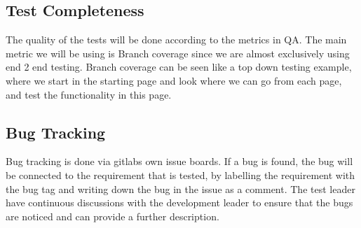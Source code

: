 \subsection{Test Completeness}
The quality of the tests will be done according to the metrics in QA. The main metric we will be using is Branch coverage since we are almost exclusively using end 2 end testing. Branch coverage can be seen like a top down testing example, where we start in the starting page and look where we can go from each page, and test the functionality in this page. 

\subsection{Bug Tracking}
Bug tracking is done via gitlabs own issue boards. If a bug is found, the bug will be connected to the requirement that is tested, by labelling the requirement with the bug tag and writing down the bug in the issue as a comment. The test leader have continuous discussions with the development leader to ensure that the bugs are noticed and can provide a further description.

\clearpage